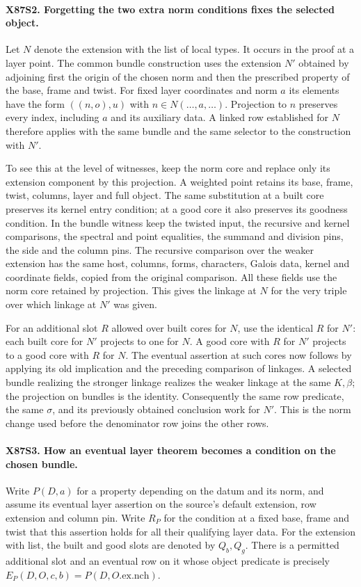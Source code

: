 \paragraph{X87S2. Forgetting the two extra norm conditions fixes the selected object.}
Let $N$ denote the extension with the list of local types. It occurs
in the proof at a layer point. The common bundle construction uses
the extension $N'$ obtained by adjoining first the origin of the
chosen norm and then the prescribed property of the base, frame
and twist. For fixed layer coordinates and norm $a$ its elements
have the form $((n,o),u)$ with $n\in N(\ldots,a,\ldots)$.
Projection to $n$ preserves every index, including $a$ and its
auxiliary data. A linked row established for $N$ therefore applies
with the same bundle and the same selector to the construction with
$N'$.

To see this at the level of witnesses, keep the norm core and
replace only its extension component by this projection. A weighted
point retains its base, frame, twist, columns, layer and full object.
The same substitution at a built core preserves its kernel entry
condition; at a good core it also preserves its goodness condition.
In the bundle witness keep the twisted input, the recursive and kernel
comparisons, the spectral and point equalities, the summand and
division pins, the side and the column pins. The recursive comparison
over the weaker extension has the same host, columns, forms,
characters, Galois data, kernel and coordinate fields, copied from
the original comparison. All these fields use the norm core retained
by projection. This gives the linkage at $N$ for the very triple
over which linkage at $N'$ was given.

For an additional slot $R$ allowed over built cores for $N$, use
the identical $R$ for $N'$: each built core for $N'$ projects to
one for $N$. A good core with $R$ for $N'$ projects to a good core
with $R$ for $N$. The eventual assertion at such cores now follows
by applying its old implication and the preceding comparison of
linkages. A selected bundle realizing the stronger linkage realizes
the weaker linkage at the same $K,\beta$; the projection on bundles
is the identity. Consequently the same row predicate, the same
$\sigma$, and its previously obtained conclusion work for $N'$.
This is the norm change used before the denominator row joins the
other rows.

\paragraph{X87S3. How an eventual layer theorem becomes a condition on the chosen bundle.}
Write $P(D,a)$ for a property depending on the datum and its norm,
and assume its eventual layer assertion on the source's default
extension, row extension and column pin. Write $R_P$ for the
condition at a fixed base, frame and twist that this assertion holds
for all their qualifying layer data. For the extension with list,
the built and good slots are denoted by $Q_b,Q_g$. There is a
permitted additional slot and an eventual row on it whose object
predicate is precisely $E_P(D,O,c,b)=P(D,O.\mathrm{ex}.\mathrm{nch})$.

